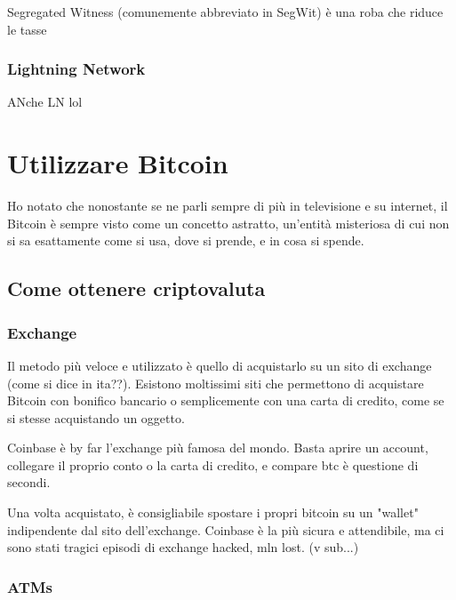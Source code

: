 \documentclass {article}
\begin{document}
Segregated Witness (comunemente abbreviato in SegWit) è una roba che riduce le tasse



\subsubsection {Lightning Network}



ANche LN lol



\section {Utilizzare Bitcoin}



Ho notato che nonostante se ne parli sempre di più in televisione e su internet, il Bitcoin è sempre visto come un concetto astratto, un'entità misteriosa di cui non si sa esattamente come si usa, dove si prende, e in cosa si spende.



\subsection {Come ottenere criptovaluta}



\subsubsection {Exchange}



Il metodo più veloce e utilizzato è quello di acquistarlo su un sito di exchange (come si dice in ita??). Esistono moltissimi siti che permettono di acquistare Bitcoin con bonifico bancario o semplicemente con una carta di credito, come se si stesse acquistando un oggetto.

Coinbase è by far l'exchange più famosa del mondo. Basta aprire un account, collegare il proprio conto o la carta di credito, e compare btc è questione di secondi.

Una volta acquistato, è consigliabile spostare i propri bitcoin su un "wallet" indipendente dal sito dell'exchange. Coinbase è la più sicura e attendibile, ma ci sono stati tragici episodi di exchange hacked, mln lost. (v sub...)



\subsubsection {ATMs}
\end{document}
